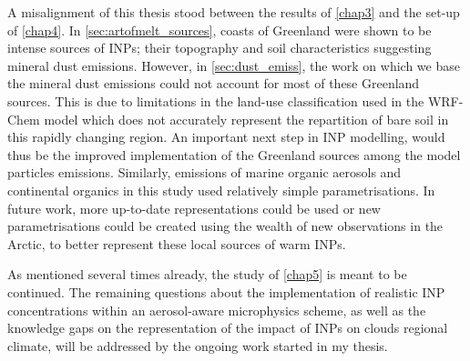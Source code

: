 A misalignment of this thesis stood between the results of \cref{chap3} and the set-up of \cref{chap4}. In \cref{sec:artofmelt_sources}, coasts of Greenland were shown to be intense sources of INPs; their topography and soil characteristics suggesting mineral dust emissions. 
However, in \cref{sec:dust_emiss}, the work on which we base the mineral dust emissions could not account for most of these Greenland sources. This is due to limitations in the land-use classification used in the WRF-Chem model which does not accurately represent the repartition of bare soil in this rapidly changing region.
An important next step in INP modelling, would thus be the improved implementation of the Greenland sources among the model particles emissions.
Similarly, emissions of marine organic aerosols and continental organics in this study used relatively simple parametrisations. In future work, more up-to-date representations could be used or new parametrisations could be created using the wealth of new observations in the Arctic, to better represent these local sources of warm INPs.

As mentioned several times already, the study of \cref{chap5} is meant to be continued. The remaining questions about the implementation of realistic INP concentrations within an aerosol-aware microphysics scheme, as well as the knowledge gaps on the representation of the impact of INPs on clouds regional climate, will be addressed by the ongoing work started in my thesis.
\vspace{\baselineskip}


